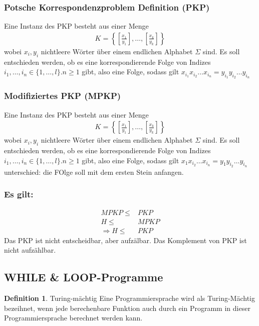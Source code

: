 \documentclass[a4paper, 10pt]{article}
\theoremstyle{definition}
\newtheorem{definition}{Definition}[section]
\begin{document}
\subsubsection{Potsche Korrespondenzproblem Definition (PKP)}
Eine Instanz des PKP besteht aus einer Menge \begin{align*}
    K=\left\{\left[\frac{x_1}{y_1}\right],\dots,\left[\frac{x_k}{y_k}\right]\right\}
\end{align*}wobei $x_i,y_i$ nichtleere Wörter über einem endlichen Alphabet $\Sigma$ sind. Es soll entschieden werden, ob es eine korrespondierende Folge von Indizes $i_1,\dots,i_n\in\{1,\dots,l\}.n\geq 1$ gibt, also eine Folge, sodass gilt $x_{i_1}x_{i_2}\dots x_{i_n}=y_{i_1}y_{i_2}\dots y_{i_n}$\subsubsection{Modifiziertes PKP (MPKP)}
Eine Instanz des PKP besteht aus einer Menge \begin{align*}
    K=\left\{\left[\frac{x_1}{y_1}\right],\dots,\left[\frac{x_k}{y_k}\right]\right\}
\end{align*}wobei $x_i,y_i$ nichtleere Wörter über einem endlichen Alphabet $\Sigma$ sind. Es soll entschieden werden, ob es eine korrespondierende Folge von Indizes $i_1,\dots,i_n\in\{1,\dots,l\}.n\geq 1$ gibt, also eine Folge, sodass gilt $x_1x_{i_2}\dots x_{i_n}=y_1y_{i_2}\dots y_{i_n}$ unterschied: die FOlge soll mit dem ersten Stein anfangen.
\subsubsection{Es gilt:}
\begin{align*}
    MPKP\leq& PKP\\
    H\leq& MPKP\\
    \Longrightarrow H\leq & PKP
\end{align*}
Das PKP ist nicht entscheidbar, aber aufzälbar. Das Komplement von PKP ist nicht aufzählbar.

\subsection{WHILE \& LOOP-Programme}
\begin{definition}{Turing-mächtig}
Eine Programmiersprache wird als Turing-Mächtig bezeihnet, wenn jede berechenbare Funktion auch durch ein Programm in dieser Programmiersprache berechnet werden kann.
\end{definition}
\end{document}
